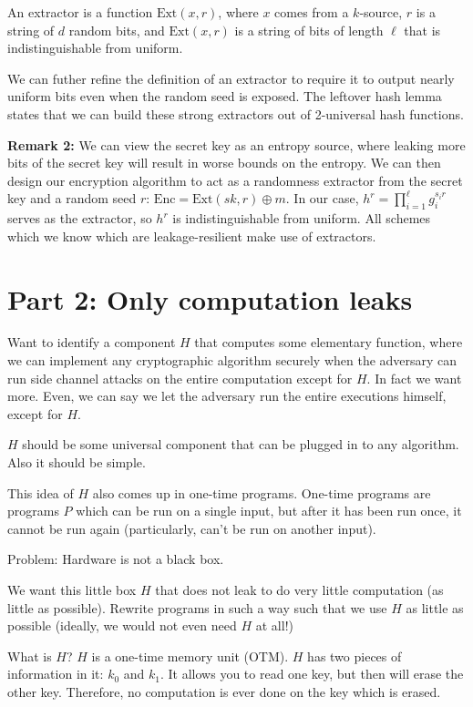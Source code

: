 \documentclass[10pt]{article}
\begin{document}
\begin{definition}
An extractor is a function $\mathrm{Ext}(x,r)$, where $x$ comes from a $k$-source, $r$ is a string of $d$ random bits, and $\mathrm{Ext}(x,r)$ is a string of bits of length $\ell$ that is indistinguishable from uniform.
\end{definition}

We can futher refine the definition of an extractor to require it to output nearly uniform bits even when the random seed is exposed. The leftover hash lemma states that we can build these strong extractors out of 2-universal hash functions.

\textbf{Remark 2:} We can view the secret key as an entropy source, where leaking more bits of the secret key will result in worse bounds on the entropy. We can then design our encryption algorithm to act as a randomness extractor from the secret key and a random seed $r$: $\mathrm{Enc} = \mathrm{Ext}(sk,r) \oplus m$. In our case, $h^r = \prod_{i=1}^\ell g_i^{s_i r}$ serves as the extractor, so $h^r$ is indistinguishable from uniform. All schemes which we know which are leakage-resilient make
use of extractors.

\section{Part 2: Only computation leaks}

Want to identify a component $H$ that computes some elementary function, where we can implement any cryptographic algorithm securely when the adversary can run side channel attacks on the entire computation except for $H$. In fact we want more. Even, we can say we let the adversary run the entire executions himself, except for $H$.

$H$ should be some universal component that can be plugged in to any algorithm. Also it should be simple.

This idea of $H$ also comes up in one-time programs. One-time programs are programs $P$ which can be run on a single input, but after it has been run once, it cannot be run again (particularly, can't be run on another input).

Problem: Hardware is not a black box.

We want this little box $H$ that does not leak to do very little computation (as little as possible). Rewrite programs in such a way such that we use $H$ as little as possible (ideally, we would not even need $H$ at all!)

What is $H$? $H$ is a one-time memory unit (OTM). $H$ has two pieces of information in it: $k_0$ and $k_1$. It allows you to read one key, but then will erase the other key. Therefore, no computation is ever done on the key which is erased.
\end{document}
